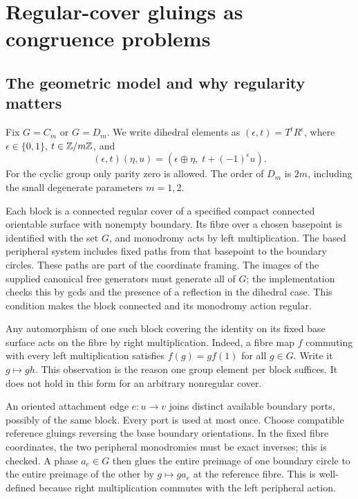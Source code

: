 \section{Regular-cover gluings as congruence problems}
\label{sec:gluings}

\subsection{The geometric model and why regularity matters}

Fix $G=C_m$ or $G=D_m$. We write dihedral elements as
$(\epsilon,t)=T^tR^\epsilon$, where $\epsilon\in\{0,1\}$,
$t\in\mathbb Z/m\mathbb Z$, and
\begin{equation}
 (\epsilon,t)(\eta,u)
   =(\epsilon\mathbin\oplus\eta,\;t+(-1)^\epsilon u).
 \label{eq:dihedral-product}
\end{equation}
For the cyclic group only parity zero is allowed. The order of $D_m$ is
$2m$, including the small degenerate parameters $m=1,2$.

Each block is a connected regular cover of a specified compact connected
orientable surface with nonempty boundary. Its fibre over a chosen basepoint
is identified with the set $G$, and monodromy acts by left multiplication.
The based peripheral system includes fixed paths from that basepoint to the
boundary circles. These paths are part of the coordinate framing.
The images of the supplied canonical free generators must generate all of
$G$; the implementation checks this by gcds and the presence of a reflection
in the dihedral case. This condition makes the block connected and its
monodromy action regular.

Any automorphism of one such block covering the identity on its fixed base
surface acts on the fibre by right multiplication. Indeed, a fibre map $f$
commuting with every left multiplication satisfies
$f(g)=gf(1)$ for all $g\in G$. Write it $g\mapsto gh$.
This observation is the reason one group element per block suffices.
It does not hold in this form for an arbitrary nonregular cover.

An oriented attachment edge $e:u\to v$ joins distinct available boundary
ports, possibly of the same block. Every port is used at most once. Choose
compatible reference gluings reversing the base boundary orientations. In
the fixed fibre coordinates, the two peripheral monodromies must be exact
inverses; this is checked. A phase $a_e\in G$ then glues the entire preimage
of one boundary circle to the entire preimage of the other by
$g\mapsto ga_e$ at the reference fibre. This is well-defined because right
multiplication commutes with the left peripheral action.

